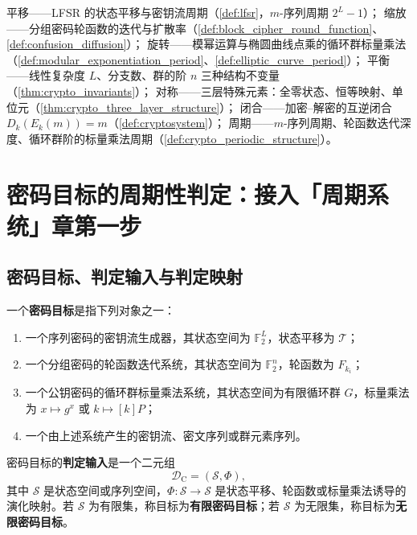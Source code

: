 \begin{remark}[本章七主题导引]\label{rem:crypto_seven_themes}
平移——LFSR 的状态平移与密钥流周期（\cref{def:lfsr}，\(m\)-序列周期 \(2^L-1\)）；
缩放——分组密码轮函数的迭代与扩散率（\cref{def:block_cipher_round_function}、\cref{def:confusion_diffusion}）；
旋转——模幂运算与椭圆曲线点乘的循环群标量乘法（\cref{def:modular_exponentiation_period}、\cref{def:elliptic_curve_period}）；
平衡——线性复杂度 \(L\)、分支数、群的阶 \(n\) 三种结构不变量（\cref{thm:crypto_invariants}）；
对称——三层特殊元素：全零状态、恒等映射、单位元（\cref{thm:crypto_three_layer_structure}）；
闭合——加密--解密的互逆闭合 \(D_k(E_k(m))=m\)（\cref{def:cryptosystem}）；
周期——\(m\)-序列周期、轮函数迭代深度、循环群阶的标量乘法周期（\cref{def:crypto_periodic_structure}）。
\end{remark}

\section{密码目标的周期性判定：接入「周期系统」章第一步}
\label{sec:crypto_periodicity_decision}

\subsection{密码目标、判定输入与判定映射}

\begin{definition}[密码目标与判定输入]\label{def:crypto_target}
一个\textbf{密码目标}是指下列对象之一：
\begin{enumerate}[label=(\roman*)]
    \item 一个序列密码的密钥流生成器，其状态空间为 \(\mathbb F_2^L\)，状态平移为 \(\mathcal T\)；
    \item 一个分组密码的轮函数迭代系统，其状态空间为 \(\mathbb F_2^n\)，轮函数为 \(F_{k_i}\)；
    \item 一个公钥密码的循环群标量乘法系统，其状态空间为有限循环群 \(G\)，标量乘法为 \(x\mapsto g^x\) 或 \(k\mapsto [k]P\)；
    \item 一个由上述系统产生的密钥流、密文序列或群元素序列。
\end{enumerate}
密码目标的\textbf{判定输入}是一个二元组
\[
\mathcal D_{\mathrm{C}}=(\mathcal S,\Phi),
\]
其中 \(\mathcal S\) 是状态空间或序列空间，\(\Phi:\mathcal S\to\mathcal S\) 是状态平移、轮函数或标量乘法诱导的演化映射。若 \(\mathcal S\) 为有限集，称目标为\textbf{有限密码目标}；若 \(\mathcal S\) 为无限集，称目标为\textbf{无限密码目标}。
\end{definition}

